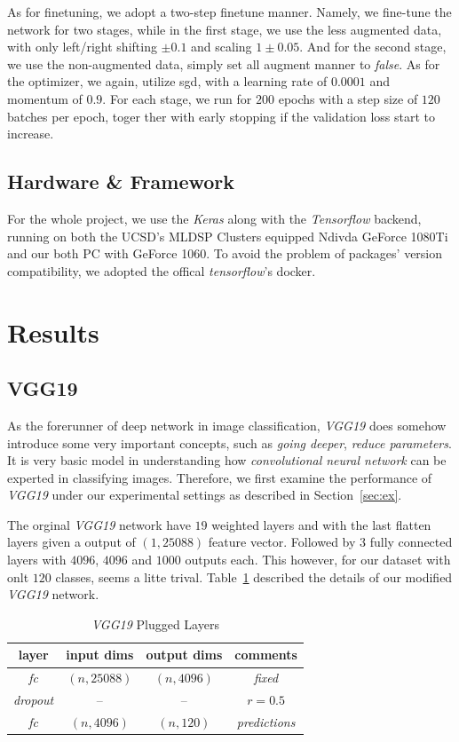 \documentclass{article}
\begin{document}
As for finetuning, we adopt a two-step finetune manner. 
Namely, we fine-tune the network for two stages, while in the first stage, we use the less augmented data, with only left/right shifting $\pm 0.1$ and scaling $1\pm0.05$. 
And for the second stage, we use the non-augmented data, simply set all augment manner to \emph{false}. 
As for the optimizer, we again, utilize sgd, with a learning rate of $0.0001$ and momentum of $0.9$. 
For each stage, we run for $200$ epochs with a step size of $120$ batches per epoch, toger ther with early stopping if the validation loss start to increase. 

\subsection{Hardware \& Framework}
For the whole project, we use the \emph{Keras} along with the \emph{Tensorflow} backend, running on both the UCSD's MLDSP Clusters equipped Ndivda GeForce 1080Ti and our both PC with GeForce 1060. 
To avoid the problem of packages' version compatibility, we adopted the offical \emph{tensorflow}'s docker. 

\section{Results}

\subsection{VGG19}
As the forerunner of deep network in image classification, \emph{VGG19} does somehow introduce some very important concepts, such as \emph{going deeper}, \emph{reduce parameters}. 
It is very basic model in understanding how \emph{convolutional neural network} can be experted in classifying images. 
Therefore, we first examine the performance of \emph{VGG19} under our experimental settings as described in Section~\ref{sec:ex}.

The orginal \emph{VGG19} network have $19$ weighted layers and with the last flatten layers given a output of $(1, 25088)$ feature vector. 
Followed by $3$ fully connected layers with $4096$, $4096$ and $1000$ outputs each. 
This however, for our dataset with onlt $120$ classes, seems a litte trival. 
Table~\ref{tab:vgg19} described the details of our modified \emph{VGG19} network. 
\begin{table}[h]
	\centering
	\caption{\emph{VGG19} Plugged Layers}
	\label{tab:vgg19}
	\begin{tabular}{c|ccc}
		\toprule
		layer & input dims & output dims & comments \\
		\midrule
		\emph{fc} & $(n, 25088)$ & $(n,4096)$ & \emph{fixed} \\
		\emph{dropout} & -- & -- &  $r =  0.5$ \\
		\emph{fc} & $(n,4096)$ & $(n,120)$ & \emph{predictions} \\
		\bottomrule
	\end{tabular}
\end{table}
\end{document}
